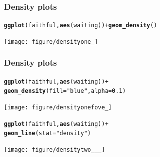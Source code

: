 \documentclass{beamer}\usepackage[]{graphicx}\usepackage[]{color}
\makeatletter
\newcommand{\hlstr}[1]{\textcolor[rgb]{0.192,0.494,0.8}{#1}}%
\newcommand{\hlkwd}[1]{\textcolor[rgb]{0.737,0.353,0.396}{\textbf{#1}}}%
\newenvironment{kframe}{%
 \def\at@end@of@kframe{}%
 \ifinner\ifhmode%
  \def\at@end@of@kframe{\end{minipage}}%
  \begin{minipage}{\columnwidth}%
 \fi\fi%
 \def\FrameCommand##1{\hskip\@totalleftmargin \hskip-\fboxsep
 \colorbox{shadecolor}{##1}\hskip-\fboxsep
     \hskip-\linewidth \hskip-\@totalleftmargin \hskip\columnwidth}%
 \MakeFramed {\advance\hsize-\width
   \@totalleftmargin\z@ \linewidth\hsize
   \@setminipage}}%
 {\par\unskip\endMakeFramed%
 \at@end@of@kframe}
\newenvironment{knitrout}{}{} %
\makeatother
\begin{document}
\begin{frame}[fragile]
\frametitle{Density plots}
\begin{knitrout}\footnotesize
{}\color{fgcolor}\begin{kframe}
\begin{alltt}
\hlkwd{ggplot}(faithful, \hlkwd{aes}(waiting)) + \hlkwd{geom_density}()
\end{alltt}
\end{kframe}

{\centering \texttt{[image: figure/densityone\_]} 

}



\end{knitrout}

\end{frame}


\begin{frame}[fragile]
\frametitle{Density plots}
\begin{knitrout}\footnotesize
{}\color{fgcolor}\begin{kframe}
\begin{alltt}
\hlkwd{ggplot}(faithful, \hlkwd{aes}(waiting)) +
\hlkwd{geom_density}(fill = \hlstr{"blue"}, alpha = 0.1)
\end{alltt}
\end{kframe}

{\centering \texttt{[image: figure/densityonefove\_]} 

}



\end{knitrout}

\end{frame}


\begin{frame}[fragile]
\begin{knitrout}\footnotesize
{}\color{fgcolor}\begin{kframe}
\begin{alltt}
\hlkwd{ggplot}(faithful, \hlkwd{aes}(waiting)) +
\hlkwd{geom_line}(stat = \hlstr{"density"})
\end{alltt}
\end{kframe}

{\centering \texttt{[image: figure/densitytwo\_\_\_]} 

}



\end{knitrout}

\end{frame}
\end{document}
